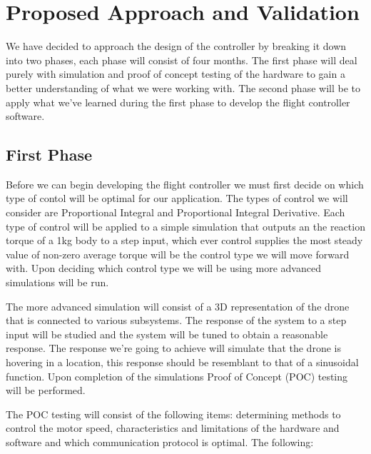 \section{Proposed Approach and Validation}
We have decided to approach the design of the controller by breaking it down into two phases, each phase will consist of four months. The first phase will deal purely with simulation and proof of concept testing of the hardware to gain a better understanding of what we were working with. The second phase will be to apply what we've learned during the first phase to develop the flight controller software.

\subsection{First Phase}
Before we can begin developing the flight controller we must first decide on which type of contol will be optimal for our application. The types of control we will consider are Proportional Integral and Proportional Integral Derivative. Each type of control will be applied to a simple simulation that outputs an the reaction torque of a 1kg body to a step input, which ever control supplies the most steady value of non-zero average torque will be the control type we will move forward with. Upon deciding which control type we will be using more advanced simulations will be run.

The more advanced simulation will consist of a 3D representation of the drone that is connected to various subsystems. The response of the system to a step input will be studied and the system will be tuned to obtain a reasonable response. The response we're going to achieve will simulate that the drone is hovering in a location, this response should be resemblant to that of a sinusoidal function. Upon completion of the simulations Proof of Concept (POC) testing will be performed. 

The POC testing will consist of the following items: determining methods to control the motor speed, characteristics and limitations of the hardware and software and which communication protocol is optimal. The following:

 

